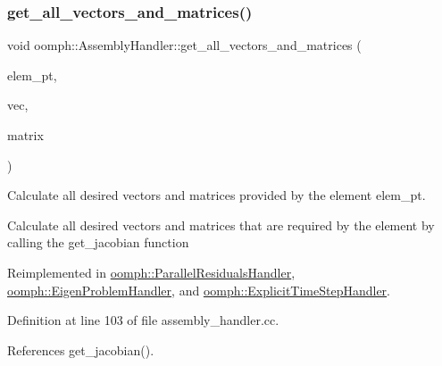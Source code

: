 \mbox{\label{classoomph_1_1AssemblyHandler_ab2e4ee4623116b18245ca90cfe9ba144}} 
\subsubsection{\texorpdfstring{get\+\_\+all\+\_\+vectors\+\_\+and\+\_\+matrices()}{get\_all\_vectors\_and\_matrices()}}
{\footnotesize\ttfamily void oomph\+::\+Assembly\+Handler\+::get\+\_\+all\+\_\+vectors\+\_\+and\+\_\+matrices (\begin{DoxyParamCaption}\item[{\hyperlink{classoomph_1_1GeneralisedElement}{Generalised\+Element} $\ast$const \&}]{elem\+\_\+pt,  }\item[{\hyperlink{classoomph_1_1Vector}{Vector}$<$ \hyperlink{classoomph_1_1Vector}{Vector}$<$ double $>$ $>$ \&}]{vec,  }\item[{\hyperlink{classoomph_1_1Vector}{Vector}$<$ \hyperlink{classoomph_1_1DenseMatrix}{Dense\+Matrix}$<$ double $>$ $>$ \&}]{matrix }\end{DoxyParamCaption})\hspace{0.3cm}{\ttfamily [virtual]}}



Calculate all desired vectors and matrices provided by the element elem\+\_\+pt. 

Calculate all desired vectors and matrices that are required by the element by calling the get\+\_\+jacobian function 

Reimplemented in \hyperlink{classoomph_1_1ParallelResidualsHandler_adea071e3131e4e84b7c3e9400892fb17}{oomph\+::\+Parallel\+Residuals\+Handler}, \hyperlink{classoomph_1_1EigenProblemHandler_aa88f56b5c724c41e0c2926434ae920da}{oomph\+::\+Eigen\+Problem\+Handler}, and \hyperlink{classoomph_1_1ExplicitTimeStepHandler_a842529121fbe177ea6900d668d8b2a65}{oomph\+::\+Explicit\+Time\+Step\+Handler}.



Definition at line 103 of file assembly\+\_\+handler.\+cc.



References get\+\_\+jacobian().



